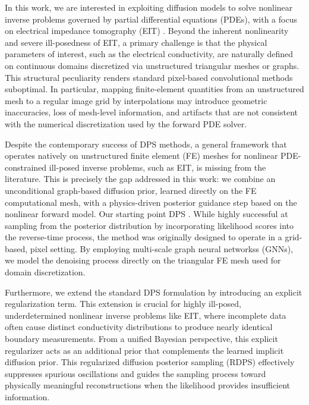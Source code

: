 \documentclass[a4paper,11pt]{article}
\theoremstyle{definition}
\theoremstyle{plain}
\theoremstyle{remark}
\begin{document}
In this work, we are interested in exploiting diffusion models to solve nonlinear inverse problems governed by partial differential equations (PDEs), with a focus on electrical impedance tomography (EIT) \cite{cheney-isaacson-newell-1999,borcea-2002}. Beyond the inherent nonlinearity and severe ill-posedness of EIT, a primary challenge is that the physical parameters of interest, such as the electrical conductivity, are naturally defined on continuous domains discretized via unstructured triangular meshes or graphs. This structural peculiarity renders standard pixel-based convolutional methods suboptimal.
In particular, mapping finite-element quantities from an unstructured mesh to a regular image grid by interpolations may introduce geometric inaccuracies, loss of mesh-level information, and artifacts that are not consistent with the numerical discretization used by the forward PDE solver.

Despite the contemporary success of DPS methods, a general framework that operates natively on unstructured finite element (FE) meshes for nonlinear PDE-constrained ill-posed inverse problems, such as EIT, is missing from the literature. This is precisely the gap addressed in this work: we combine an unconditional graph-based diffusion prior, learned directly on the FE computational mesh, with a physics-driven posterior guidance step based on the nonlinear forward model.
Our starting point DPS \cite{DPS24}. While highly successful at sampling from the posterior distribution by incorporating likelihood scores into the reverse-time process, the method was originally designed to operate in a grid-based, pixel setting.  
By employing multi-scale graph neural networkss (GNNs), we model the denoising process directly on the triangular FE mesh used for domain discretization.

Furthermore, we extend the standard DPS formulation by introducing an explicit regularization term. This extension is crucial for highly ill-posed, underdetermined nonlinear inverse problems like EIT, where incomplete data often cause distinct conductivity distributions to produce nearly identical boundary measurements.
From a unified Bayesian perspective, this explicit regularizer acts as an additional prior that complements the learned implicit diffusion prior. This regularized diffusion posterior sampling (RDPS) effectively suppresses spurious oscillations and guides the sampling process toward physically meaningful reconstructions when the likelihood provides insufficient information.
\end{document}
